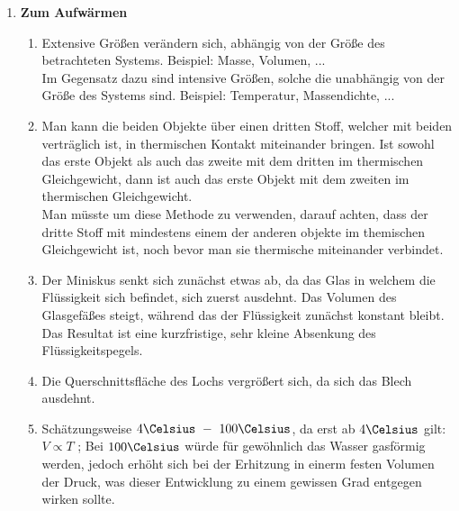\documentclass[11pt,letterpaper]{article}
\begin{document}

\begin{enumerate}
    \item \textbf{Zum Aufwärmen}
    \begin{enumerate}
        \item 
            Extensive Größen verändern sich, abhängig von der Größe des betrachteten Systems.
            Beispiel: Masse, Volumen, ...\\[1ex]
            Im Gegensatz dazu sind intensive Größen, solche die unabhängig von der Größe des Systems sind.
            Beispiel: Temperatur, Massendichte, ...
        \item 
            Man kann die beiden Objekte über einen dritten Stoff, 
            welcher mit beiden verträglich ist, 
            in thermischen Kontakt miteinander bringen.
            Ist sowohl das erste Objekt als auch das zweite mit dem dritten im thermischen Gleichgewicht, 
            dann ist auch das erste Objekt mit dem zweiten im thermischen Gleichgewicht. \\
            Man müsste um diese Methode zu verwenden, darauf achten, dass der dritte Stoff mit 
            mindestens einem der anderen objekte im themischen Gleichgewicht ist, noch bevor man 
            sie thermische miteinander verbindet. 
        \item 
            Der Miniskus senkt sich zunächst etwas ab, da das Glas in welchem die Flüssigkeit
            sich befindet, sich zuerst ausdehnt. Das Volumen des Glasgefäßes steigt, während das
            der Flüssigkeit zunächst konstant bleibt. Das Resultat ist eine kurzfristige, sehr kleine 
            Absenkung des Flüssigkeitspegels.
        \item 
            Die Querschnittsfläche des Lochs vergrößert sich, da sich das Blech ausdehnt.
        \item 
            Schätzungsweise $4\Celsius \ -\ 100\Celsius $, da erst ab $4\Celsius$ gilt: $ V \propto T$
            ; Bei $100\Celsius$ würde für gewöhnlich das Wasser gasförmig werden, jedoch erhöht sich bei
            der Erhitzung in einerm festen Volumen der Druck, was dieser Entwicklung zu einem gewissen Grad entgegen wirken sollte.
    \end{enumerate}


\end{enumerate}
\end{document}
